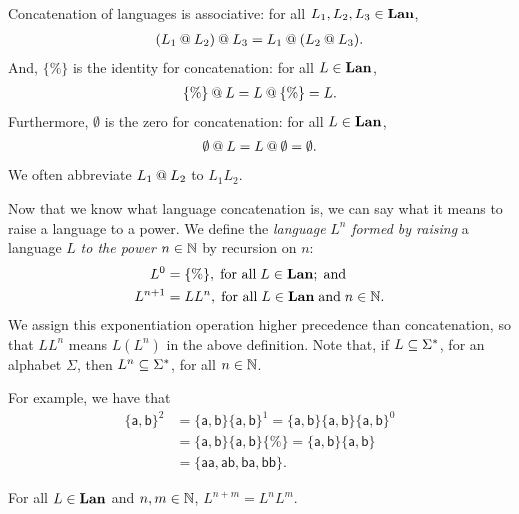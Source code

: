 Concatenation of languages is associative: for all $L_1,L_2,L_3\in\mathbf{Lan}$,
%
%
%
\begin{gather*}
(L_1\mathbin{@} L_2)\mathbin{@} L_3 = L_1\mathbin{@}(L_2\mathbin{@} L_3) .
\end{gather*}
And, $\{\%\}$ is the identity for concatenation:
%
%
%
for all $L\in\mathbf{Lan}$,
\begin{gather*}
{\{\%\}}\mathbin{@} L=L\mathbin{@}{\{\%\}}=L.
\end{gather*}
Furthermore, $\emptyset$ is the zero for concatenation:
%
%
%
for all $L\in\mathbf{Lan}$,
\begin{gather*}
\emptyset\mathbin{@} L=L\mathbin{@}\emptyset={\emptyset} .
\end{gather*}
We often abbreviate $L_1\mathbin{@} L_2$ to $L_1L_2$.

Now that we know what language concatenation is, we can say what it
means to raise a language to a power.  We define the \emph{language}
%
%
$L^n$ \emph{formed by raising} a language $L$ \emph{to the
  power} $n\in\mathbb{N}$
%
%
by recursion on $n$:
\begin{align*}
L^0      &= {\{\%\}} , \;\allowbreak\mbox{for all}\allowbreak\;L\in\mathbf{Lan} ; \;\allowbreak\mbox{and}\allowbreak\; \\
L^{n + 1} &= LL^n ,\;\allowbreak\mbox{for all}\allowbreak\;L\in\mathbf{Lan}\;\allowbreak\mbox{and}\allowbreak\;n\in\mathbb{N} .
\end{align*}
We assign this exponentiation operation higher precedence than
concatenation, so that $LL^n$ means $L(L^n)$ in the above definition.
Note that, if $L\subseteq\Sigma^*$, for an alphabet $\Sigma$, then
$L^n\subseteq\Sigma^*$, for all $n\in\mathbb{N}$.

For example, we have that
\begin{align*}
\mathsf{\{a,b\}}^2 &= 
\mathsf{\{a,b\}}\mathsf{\{a,b\}}^1 =
\mathsf{\{a,b\}}\mathsf{\{a,b\}}\mathsf{\{a,b\}}^0 \\
&=\mathsf{\{a,b\}}\mathsf{\{a,b\}}\{\%\} =
\mathsf{\{a,b\}}\mathsf{\{a,b\}} \\
&=\mathsf{\{aa, ab, ba, bb\}}.
\end{align*}

\begin{proposition}
\label{LangExponProp1}
For all $L\in\mathbf{Lan}$ and $n,m\in\mathbb{N}$, $L^{n+m}=L^nL^m$.
\end{proposition}

